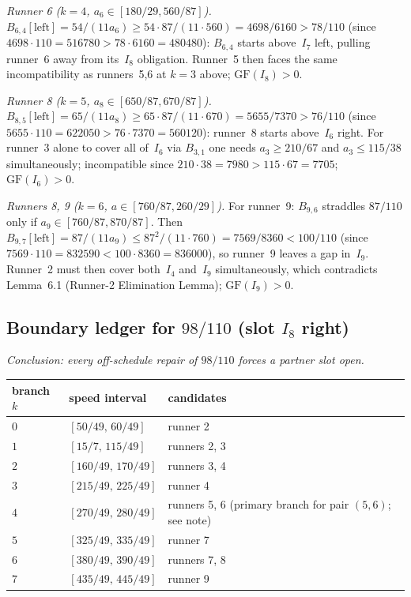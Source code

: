 \documentclass[12pt]{article}
\begin{document}
\emph{Runner 6 ($k=4$, $a_6\in[180/29,560/87]$).}
$B_{6,4}[\mathrm{left}]=54/(11a_6)\ge54\cdot87/(11\cdot560)=4698/6160>78/110$
(since $4698\cdot110=516780>78\cdot6160=480480$): $B_{6,4}$ starts above~$I_7$ left,
pulling runner~6 away from its~$I_8$ obligation. Runner~5 then faces the same
incompatibility as runners~5,6 at $k=3$ above; $\mathrm{GF}(I_8)>0$.

\emph{Runner 8 ($k=5$, $a_8\in[650/87,670/87]$).}
$B_{8,5}[\mathrm{left}]=65/(11a_8)\ge65\cdot87/(11\cdot670)=5655/7370>76/110$
(since $5655\cdot110=622050>76\cdot7370=560120$): runner~8 starts above~$I_6$ right.
For runner~3 alone to cover all of~$I_6$ via $B_{3,1}$ one needs $a_3\ge210/67$
and $a_3\le115/38$ simultaneously; incompatible since $210\cdot38=7980>115\cdot67=7705$;
$\mathrm{GF}(I_6)>0$.

\emph{Runners 8, 9 ($k=6$, $a\in[760/87,260/29]$).}
For runner~9: $B_{9,6}$ straddles $87/110$ only if $a_9\in[760/87,870/87]$.
Then $B_{9,7}[\mathrm{left}]=87/(11a_9)\le87^2/(11\cdot760)=7569/8360<100/110$
(since $7569\cdot110=832590<100\cdot8360=836000$), so runner~9 leaves a gap in~$I_9$.
Runner~2 must then cover both~$I_4$ and~$I_9$ simultaneously, which contradicts
Lemma~6.1 (Runner-2 Elimination Lemma); $\mathrm{GF}(I_9)>0$.

\subsection{Boundary ledger for $98/110$ (slot $I_8$ right)}

\emph{Conclusion: every off-schedule repair of $98/110$ forces a partner slot open.}

\begin{center}
\begin{tabular}{@{}lll@{}}
\toprule
branch $k$ & speed interval & candidates \\
\midrule
$0$ & $[50/49,\,60/49]$ & runner 2 \\
$1$ & $[15/7,\,115/49]$ & runners 2, 3 \\
$2$ & $[160/49,\,170/49]$ & runners 3, 4 \\
$3$ & $[215/49,\,225/49]$ & runner 4 \\
$4$ & $[270/49,\,280/49]$ & runners 5, 6 (primary branch for pair $(5,6)$; see note) \\
$5$ & $[325/49,\,335/49]$ & runner 7 \\
$6$ & $[380/49,\,390/49]$ & runners 7, 8 \\
$7$ & $[435/49,\,445/49]$ & runner 9 \\
\bottomrule
\end{tabular}
\end{center}
\end{document}

